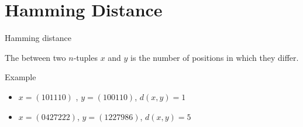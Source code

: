 \section{Hamming Distance}
\begin{parag}{Hamming distance}
    \begin{definition}
    The  between two $n$-tuples $x$ and $y$ is the number of positions in which they differ.
    \end{definition}
    \begin{subparag}{Example}
        \begin{itemize}
            \item $x = \left(101110\right)$ ,  $y = \left(100110\right)$, $d\left(x, y\right) = 1$
            \item $x = \left(0427222\right)$, $y = \left(1227986\right)$, $d\left(x, y\right) = 5$
        \end{itemize}
        
    \end{subparag}
    
\end{parag}
